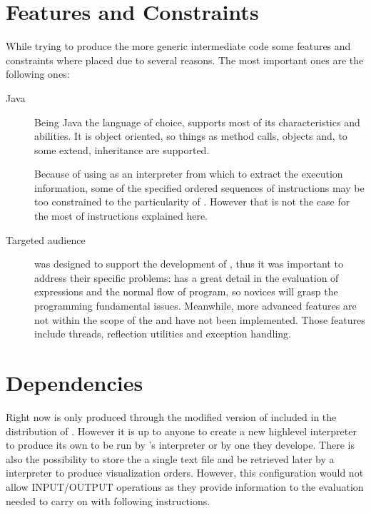 \section{Features and Constraints}
\label{sec:features}
While trying to produce the more generic intermediate code some features and constraints where placed due to several reasons. The most important ones are the following ones:
\begin{description}
\item[Java] Being Java the language of choice, \mcode{} supports most of its characteristics and abilities. It is object oriented, so things as method calls, objects and, to some extend, inheritance are supported.
\item[\djava{}]Because of using \djava{} as an interpreter from which to extract the execution information, some of the specified ordered sequences of instructions may be too constrained to the particularity of \djava{}. However that is not the case for the most of instructions explained here.
\item[Targeted audience] \mcode{} was designed to support the development of \mcode{}, thus it was important to address their specific problems: \mcode{} has a great detail in the evaluation of expressions and the normal flow of program, so novices will grasp the programming fundamental issues. Meanwhile, more advanced features are not within the scope of the \mcode{} and have not been implemented. Those features include threads, reflection utilities and exception handling. 
\end{description}

\section{Dependencies}
\label{sec:dependencies}
Right now \mcode{} is only produced through the modified version of \djava{} included in the distribution of \jel{}. However it is up to anyone to create a new high\-{}level interpreter to produce its own \mcode{} to be run by \jel{}'s \mcode{} interpreter or by one they develope. 
There is also the possibility to store the \mcode{} a single text file and be retrieved later by a \mcode{} interpreter to produce visualization orders. However, this configuration would not allow INPUT/OUTPUT operations as they provide information to the evaluation needed to carry on with following instructions. 